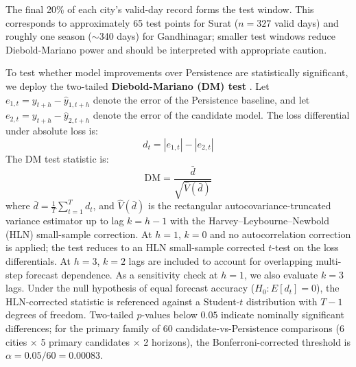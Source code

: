 The final 20\% of each city's valid-day record forms the test window. This corresponds to approximately 65 test points for Surat ($n = 327$ valid days) and roughly one season ($\sim$340 days) for Gandhinagar; smaller test windows reduce Diebold-Mariano power and should be interpreted with appropriate caution.

To test whether model improvements over Persistence are statistically significant, we deploy the two-tailed \textbf{Diebold-Mariano (DM) test} \cite{diebold1995}. Let $e_{1,t} = y_{t+h} - \hat{y}_{1,t+h}$ denote the error of the Persistence baseline, and let $e_{2,t} = y_{t+h} - \hat{y}_{2,t+h}$ denote the error of the candidate model. The loss differential under absolute loss is:
\begin{equation}
  d_t = |e_{1,t}| - |e_{2,t}|
  \label{eq:dm_diff}
\end{equation}
The DM test statistic is:
\begin{equation}
  \text{DM} = \frac{\bar{d}}{\sqrt{\hat{V}(\bar{d})}}
  \label{eq:dm_stat}
\end{equation}
where $\bar{d} = \frac{1}{T}\sum_{t=1}^T d_t$, and $\hat{V}(\bar{d})$ is the rectangular autocovariance-truncated variance estimator up to lag $k = h - 1$ with the Harvey--Leybourne--Newbold (HLN) small-sample correction. At $h=1$, $k=0$ and no autocorrelation correction is applied; the test reduces to an HLN small-sample corrected $t$-test on the loss differentials. At $h=3$, $k=2$ lags are included to account for overlapping multi-step forecast dependence. As a sensitivity check at $h=1$, we also evaluate $k=3$ lags. Under the null hypothesis of equal forecast accuracy ($H_0: E[d_t] = 0$), the HLN-corrected statistic is referenced against a Student-$t$ distribution with $T - 1$ degrees of freedom. Two-tailed $p$-values below $0.05$ indicate nominally significant differences; for the primary family of 60 candidate-vs-Persistence comparisons (6 cities $\times$ 5 primary candidates $\times$ 2 horizons), the Bonferroni-corrected threshold is $\alpha = 0.05 / 60 = 0.00083$.

